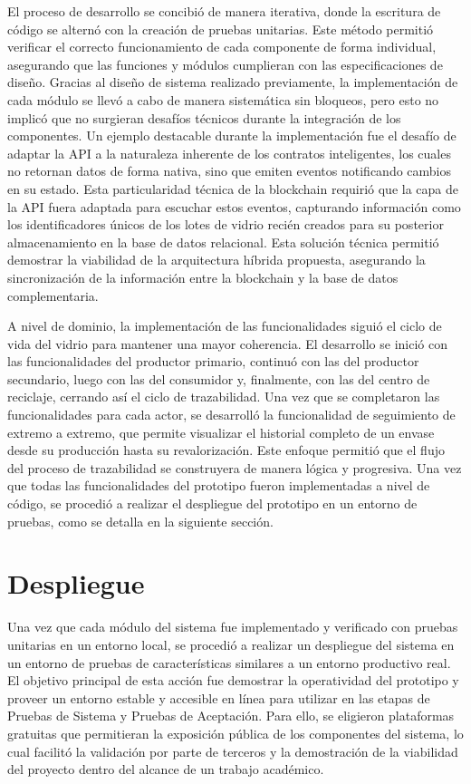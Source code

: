 El proceso de desarrollo se concibió de manera iterativa, donde la escritura de código se alternó con la creación de pruebas unitarias. Este método permitió verificar el correcto funcionamiento de cada componente de forma individual, asegurando que las funciones y módulos cumplieran con las especificaciones de diseño. Gracias al diseño de sistema realizado previamente, la implementación de cada módulo se llevó a cabo de manera sistemática sin bloqueos, pero esto no implicó que no surgieran desafíos técnicos durante la integración de los componentes. Un ejemplo destacable durante la implementación fue el desafío de adaptar la API a la naturaleza inherente de los contratos inteligentes, los cuales no retornan datos de forma nativa, sino que emiten eventos notificando cambios en su estado. Esta particularidad técnica de la blockchain requirió que la capa de la API fuera adaptada para escuchar estos eventos, capturando información como los identificadores únicos de los lotes de vidrio recién creados para su posterior almacenamiento en la base de datos relacional. Esta solución técnica permitió demostrar la viabilidad de la arquitectura híbrida propuesta, asegurando la sincronización de la información entre la blockchain y la base de datos complementaria. 

A nivel de dominio, la implementación de las funcionalidades siguió el ciclo de vida del vidrio para mantener una mayor coherencia. El desarrollo se inició con las funcionalidades del productor primario, continuó con las del productor secundario, luego con las del consumidor y, finalmente, con las del centro de reciclaje, cerrando así el ciclo de trazabilidad. Una vez que se completaron las funcionalidades para cada actor, se desarrolló la funcionalidad de seguimiento de extremo a extremo, que permite visualizar el historial completo de un envase desde su producción hasta su revalorización. Este enfoque permitió que el flujo del proceso de trazabilidad se construyera de manera lógica y progresiva. Una vez que todas las funcionalidades del prototipo fueron implementadas a nivel de código, se procedió a realizar el despliegue del prototipo en un entorno de pruebas, como se detalla en la siguiente sección.

\section{Despliegue}
\label{sec:deployment}

Una vez que cada módulo del sistema fue implementado y verificado con pruebas unitarias en un entorno local, se procedió a realizar un despliegue del sistema en un entorno de pruebas de características similares a un entorno productivo real. El objetivo principal de esta acción fue demostrar la operatividad del prototipo y proveer un entorno estable y accesible en línea para utilizar en las etapas de Pruebas de Sistema y Pruebas de Aceptación. Para ello, se eligieron plataformas gratuitas que permitieran la exposición pública de los componentes del sistema, lo cual facilitó la validación por parte de terceros y la demostración de la viabilidad del proyecto dentro del alcance de un trabajo académico.

